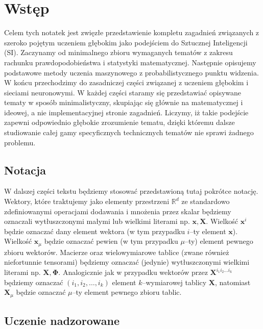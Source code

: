 \documentclass{myclass}
\numberwithin{equation}{subsection}
\begin{document}
{\footnotesize \tableofcontents}

\section{Wstęp}

Celem tych notatek jest zwięzłe przedstawienie kompletu zagadnień związanych z szeroko pojętym
uczeniem głębokim jako podejściem do Sztucznej Inteligencji (SI). Zaczynamy od minimalnego zbioru
wymaganych tematów z zakresu rachunku prawdopodobieństwa i statystyki matematycznej. Następnie
opisujemy podstawowe metody uczenia maszynowego z probabilistycznego punktu widzenia. W końcu
przechodzimy do zasadniczej części związanej z uczeniem głębokim i sieciami neuronowymi. W każdej
części staramy się przedstawiać opisywane tematy w sposób minimalistyczny, skupiając się głównie na
matematycznej i ideowej, a nie implementacyjnej stronie zagadnień. Liczymy, iż takie podejście
zapewni odpowiednio głębokie zrozumienie tematu, dzięki któremu dalsze studiowanie całej gamy
specyficznych technicznych tematów nie sprawi żadnego problemu.


\subsection{Notacja}

W dalszej części tekstu będziemy stosować przedstawioną tutaj pokrótce notację. Wektory, które
traktujemy jako elementy przestrzeni \(\mathbb{R}^d\) ze standardowo zdefiniowanymi operacjami
dodawania i mnożenia przez skalar będziemy oznaczali wytłuszczonymi małymi lub wielkimi literami np.
\(\bm{x}, \bm{X}\). Wielkość \(\bm{x}^i\) będzie oznaczać dany element wektora (w tym przypadku
\(i\)--ty element \(\bm{x}\)). Wielkość \(\bm{x}_\mu\) będzie oznaczać pewien (w tym przypadku
\(\mu\)--ty) element pewnego zbioru wektorów. Macierze oraz wielowymiarowe tablice (zwane również
niefortunnie tensorami) będziemy oznaczać (jedynie) wytłuszczonymi wielkimi literami np. \(\bm{X},
\bm{\Phi}\). Analogicznie jak w przypadku wektorów przez \(\bm{X}^{i_1 i_2 \ldots i_k}\) będziemy
oznaczać \((i_1,i_2,\ldots,i_k)\) element \(k\)--wymiarowej tablicy \(\bm{X}\), natomiast
\(\bm{X}_\mu\) będzie oznaczać \(\mu\)--ty element pewnego zbioru tablic.


\subsection{Uczenie nadzorowane}
\end{document}
